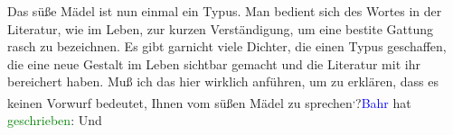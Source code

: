 \pstart
           Das süße Mädel ist nun einmal ein Typus. Man bedient sich des Wortes in der
               Literatur, wie im Leben, zur kurzen Verständigung, um eine besti{\geminationm}te Gattung rasch zu bezeichnen. Es gibt garnicht viele
               Dichter, die einen Typus geschaffen, die eine neue Gestalt im Leben sichtbar gemacht
               und \strikeout{\textcolor{gray}{×}} die Literatur mit ihr bereichert haben. Muß ich das hier wirklich anführen, um
               zu erklären, dass es keinen Vorwurf bedeutet, Ihnen vom süßen Mädel zu sprechen\substVorne{}\textsuperscript{,}\substDazwischen{}?\substHinten{}{ }\textcolor{blue}{Bahr}{}\ledrightnote{\textcolor{blue}{Hermann Bahr}} hat \textcolor{green}{geschrieben}{}\ledrightnote{{$\rightarrow$}\textcolor{green}{Das junge Österreich. II}}: \label{K_L03353-3v}\label{K_L03353-3h} Und
